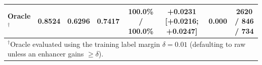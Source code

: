 \documentclass[runningheads]{llncs}
\begin{document}
\begin{table}[t]
{\begin{tabular}{l c c c c c c c}
            \midrule
            Oracle$^{\dagger}$                   & \textbf{0.8524} & \textbf{0.6296} & \textbf{0.7417} & 100.0\% / 100.0\%        & +0.0231 [+0.0216; +0.0247]          & 0.000                           & 2620 / 846 / 734             \\
            \bottomrule
            \multicolumn{8}{l}{\footnotesize $^{\dagger}$Oracle evaluated using the training label margin $\delta = 0.01$ (defaulting to raw unless an enhancer gains $\ge \delta$).}
        \end{tabular}
    }
\end{table}

\begin{table}[t]
    \centering
    \caption{Validation performance on 1{,}960 held-out images and test confusion matrix of Selector \texttt{ce+$\tau$} on 4{,}200 test images.}
    \label{tab:confusion}
\end{table}
\end{document}
